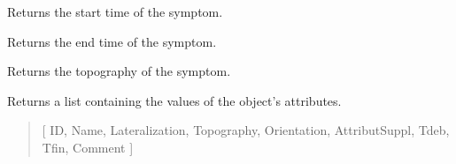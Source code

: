 \documentclass[letterpaper,10pt,english]{sphinxmanual}
\begin{document}
\begin{fulllineitems}
\begin{fulllineitems}
\label{\detokenize{annotation:annotation.class_symptome.Symptome.get_Tdeb}}
\pysigstartsignatures
{}
\pysigstopsignatures
\sphinxAtStartPar
Returns the start time of the symptom.

\end{fulllineitems}


\begin{fulllineitems}
\label{\detokenize{annotation:annotation.class_symptome.Symptome.get_Tfin}}
\pysigstartsignatures
{}
\pysigstopsignatures
\sphinxAtStartPar
Returns the end time of the symptom.

\end{fulllineitems}


\begin{fulllineitems}
\label{\detokenize{annotation:annotation.class_symptome.Symptome.get_Topography}}
\pysigstartsignatures
{}
\pysigstopsignatures
\sphinxAtStartPar
Returns the topography of the symptom.

\end{fulllineitems}


\begin{fulllineitems}
\label{\detokenize{annotation:annotation.class_symptome.Symptome.get_attributs}}
\pysigstartsignatures
{}
\pysigstopsignatures
\sphinxAtStartPar
Returns a list containing the values of the object’s attributes.
\begin{quote}\begin{description}
\sphinxAtStartPar
\begin{description}
\sphinxAtStartPar
{[}
ID,
Name,
Lateralization,
Topography,
Orientation,
AttributSuppl,
Tdeb,
Tfin,
Comment
{]}


\end{description}
\end{description}
\end{quote}
\end{fulllineitems}
\end{fulllineitems}
\end{document}
